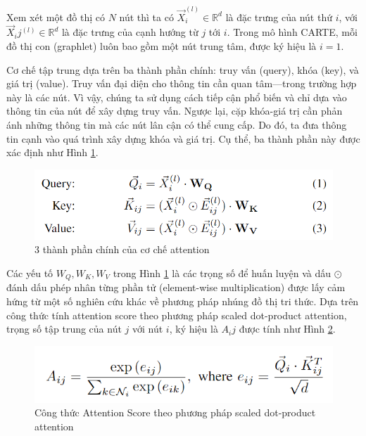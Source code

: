\documentclass{article}
\begin{document}
Xem xét một đồ thị có $N$ nút thì ta có $\vec{X}_i^{(l)} \in \mathds{R}^d$ là đặc trưng của nút thứ $i$, với $\vec{X}_ij^{(l)} \in \mathds{R}^d$ là đặc trưng của cạnh hướng từ $j$ tới $i$. Trong mô hình CARTE, mỗi đồ thị con (graphlet) luôn bao gồm một nút trung tâm, được ký hiệu là 
$i=1$. 

Cơ chế tập trung dựa trên ba thành phần chính: truy vấn (query), khóa (key), và giá trị (value). Truy vấn đại diện cho thông tin cần quan tâm—trong trường hợp này là các nút. Vì vậy, chúng ta sử dụng cách tiếp cận phổ biến và chỉ dựa vào thông tin của nút để xây dựng truy vấn. Ngược lại, cặp khóa-giá trị cần phản ánh những thông tin mà các nút lân cận có thể cung cấp. Do đó, ta đưa thông tin cạnh vào quá trình xây dựng khóa và giá trị. Cụ thể, ba thành phần này được xác định như Hình \ref{fig:architecture_attention_mechanic}.

\begin{figure} 
    \centering
    \includegraphics[scale = 0.8]{architecture_attention_mechanic.png}
    \caption{3 thành phần chính của cơ chế attention}
    \label{fig:architecture_attention_mechanic}
\end{figure}

Các yếu tố $W_Q, W_K, W_V$ trong Hình \ref{fig:architecture_attention_mechanic} là các trọng số để huấn luyện và dấu $\odot$ đánh dấu phép nhân từng phần tử (element-wise multiplication) được lấy cảm hứng từ một số nghiên cứu khác về phương pháp nhúng đồ thị tri thức. Dựa trên công thức tính attention score theo phương pháp scaled dot-product attention, trọng số tập trung của nút $j$ với nút $i$, ký hiệu là $A_ij$ được tính như Hình \ref{fig:attention_score}. 

\begin{figure} 
    \centering
    \includegraphics[scale = 0.8]{attention_score.png}
    \caption{Công thức Attention Score theo phương pháp scaled dot-product attention}
    \label{fig:attention_score}
\end{figure}
\end{document}
